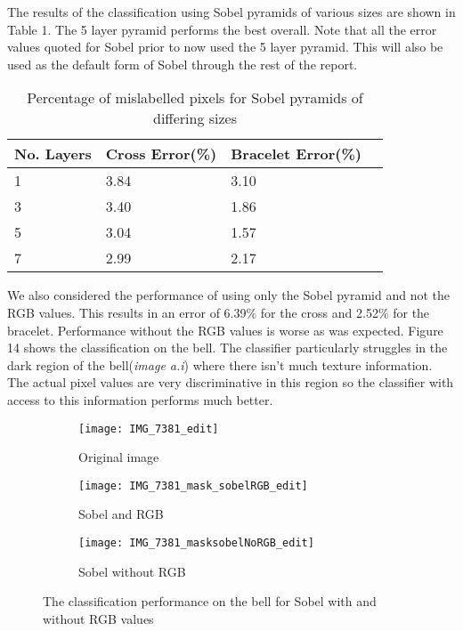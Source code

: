 \documentclass[12pt]{IIBproject}
\begin{document}
The results of the classification using Sobel pyramids of various sizes are shown in Table 1. The 5 layer pyramid performs the best overall. Note that all the error values quoted for Sobel prior to now  used the 5 layer pyramid. This will also be used as the default form of Sobel through the rest of the report.
\begin{table}[H]
\begin{center}
    \begin{tabular}{ | l | l | l | p{5cm} |}
    \hline
    No. Layers & Cross Error(\%) & Bracelet Error(\%) \\ \hline
    1 & 3.84 & 3.10 \\ \hline
    3 & 3.40 & 1.86 \\ \hline
    5 & 3.04 & 1.57 \\
    \hline
    7 & 2.99 & 2.17 \\
    \hline
    
    \end{tabular}
    \caption{Percentage of mislabelled pixels for Sobel pyramids of differing sizes}\label{table:somename}
\end{center}
\end{table}
We also considered the performance of using only the Sobel pyramid and not the RGB values. This results in an error of 6.39\% for the cross and 2.52\% for the bracelet. Performance without the RGB values is worse as was expected. Figure 14 shows the classification on the bell. The classifier particularly struggles in the dark region of the bell(\emph{image a.i}) where there isn't much texture information. The actual pixel values are very discriminative in this region so the classifier with access to this information performs much better.
\begin{figure}[H]
\centering
\begin{subfigure}{.5\textwidth}
  \centering
  \texttt{[image: IMG\_7381\_edit]}
  \caption{Original image}
  \label{fig:sub2}
\end{subfigure}
\begin{subfigure}{.5\textwidth}
  \centering
  \texttt{[image: IMG\_7381\_mask\_sobelRGB\_edit]}
  \caption{Sobel and RGB}
  \label{fig:sub1}
\end{subfigure}%
\begin{subfigure}{.5\textwidth}
  \centering
  \texttt{[image: IMG\_7381\_masksobelNoRGB\_edit]}
  \caption{Sobel without RGB}
  \label{fig:sub2}
\end{subfigure}

\caption{The classification performance on the bell for Sobel with and without RGB values}
\label{fig:test}
\end{figure}
\end{document}
